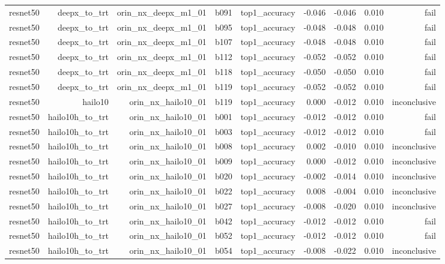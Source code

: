 \begin{table}[t]
\begin{tabular}{lrrrrrrrr}
resnet50 & deepx\_to\_trt & orin\_nx\_deepx\_m1\_01 & b091 & top1\_accuracy & -0.046 & -0.046 & 0.010 & fail \\
resnet50 & deepx\_to\_trt & orin\_nx\_deepx\_m1\_01 & b095 & top1\_accuracy & -0.048 & -0.048 & 0.010 & fail \\
resnet50 & deepx\_to\_trt & orin\_nx\_deepx\_m1\_01 & b107 & top1\_accuracy & -0.048 & -0.048 & 0.010 & fail \\
resnet50 & deepx\_to\_trt & orin\_nx\_deepx\_m1\_01 & b112 & top1\_accuracy & -0.052 & -0.052 & 0.010 & fail \\
resnet50 & deepx\_to\_trt & orin\_nx\_deepx\_m1\_01 & b118 & top1\_accuracy & -0.050 & -0.050 & 0.010 & fail \\
resnet50 & deepx\_to\_trt & orin\_nx\_deepx\_m1\_01 & b119 & top1\_accuracy & -0.052 & -0.052 & 0.010 & fail \\
resnet50 & hailo10 & orin\_nx\_hailo10\_01 & b119 & top1\_accuracy & 0.000 & -0.012 & 0.010 & inconclusive \\
resnet50 & hailo10h\_to\_trt & orin\_nx\_hailo10\_01 & b001 & top1\_accuracy & -0.012 & -0.012 & 0.010 & fail \\
resnet50 & hailo10h\_to\_trt & orin\_nx\_hailo10\_01 & b003 & top1\_accuracy & -0.012 & -0.012 & 0.010 & fail \\
resnet50 & hailo10h\_to\_trt & orin\_nx\_hailo10\_01 & b008 & top1\_accuracy & 0.002 & -0.010 & 0.010 & inconclusive \\
resnet50 & hailo10h\_to\_trt & orin\_nx\_hailo10\_01 & b009 & top1\_accuracy & 0.000 & -0.012 & 0.010 & inconclusive \\
resnet50 & hailo10h\_to\_trt & orin\_nx\_hailo10\_01 & b020 & top1\_accuracy & -0.002 & -0.014 & 0.010 & inconclusive \\
resnet50 & hailo10h\_to\_trt & orin\_nx\_hailo10\_01 & b022 & top1\_accuracy & 0.008 & -0.004 & 0.010 & inconclusive \\
resnet50 & hailo10h\_to\_trt & orin\_nx\_hailo10\_01 & b027 & top1\_accuracy & -0.008 & -0.020 & 0.010 & inconclusive \\
resnet50 & hailo10h\_to\_trt & orin\_nx\_hailo10\_01 & b042 & top1\_accuracy & -0.012 & -0.012 & 0.010 & fail \\
resnet50 & hailo10h\_to\_trt & orin\_nx\_hailo10\_01 & b052 & top1\_accuracy & -0.012 & -0.012 & 0.010 & fail \\
resnet50 & hailo10h\_to\_trt & orin\_nx\_hailo10\_01 & b054 & top1\_accuracy & -0.008 & -0.022 & 0.010 & inconclusive \\

\end{tabular}
\end{table}
